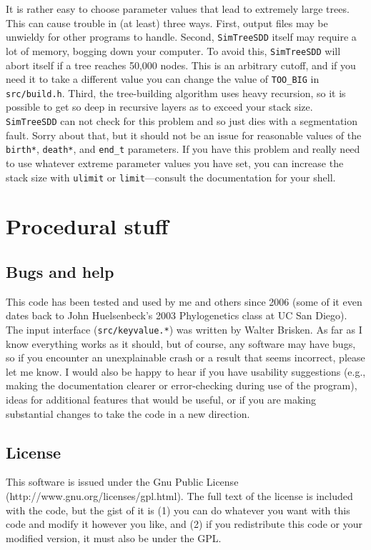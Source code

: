 \documentclass[10pt]{article}
\begin{document}
It is rather easy to choose parameter values that lead to extremely large trees.
This can cause trouble in (at least) three ways.
First, output files may be unwieldy for other programs to handle.
Second, \texttt{SimTreeSDD} itself may require a lot of memory, bogging down your computer.
To avoid this, \texttt{SimTreeSDD} will abort itself if a tree reaches 50,000 nodes.
This is an arbitrary cutoff, and if you need it to take a different value you can change the value of \texttt{TOO\_BIG} in \texttt{src/build.h}.
Third, the tree-building algorithm uses heavy recursion, so it is possible to get so deep in recursive layers as to exceed your stack size.
\texttt{SimTreeSDD} can not check for this problem and so just dies with a segmentation fault.  Sorry about that, but it should not be an issue for reasonable values of the \texttt{birth*}, \texttt{death*}, and \texttt{end\_t} parameters.
If you have this problem and really need to use whatever extreme parameter values you have set, you can increase the stack size with \texttt{ulimit} or \texttt{limit}---consult the documentation for your shell.


\section*{Procedural stuff}

\subsection*{Bugs and help}
This code has been tested and used by me and others since 2006 (some of it even dates back to John Huelsenbeck's 2003 Phylogenetics class at UC San Diego).
The input interface (\texttt{src/keyvalue.*}) was written by Walter Brisken.
As far as I know everything works as it should, but of course, any software may have bugs, so if you encounter an unexplainable crash or a result that seems incorrect, please let me know.
I would also be happy to hear if you have usability suggestions (e.g., making the documentation clearer or error-checking during use of the program), ideas for additional features that would be useful, or if you are making substantial changes to take the code in a new direction.

\subsection*{License}
This software is issued under the Gnu Public License (http://www.gnu.org/licenses/gpl.html).  
The full text of the license is included with the code, but the gist of it is (1) you can do whatever you want with this code and modify it however you like, and (2) if you redistribute this code or your modified version, it must also be under the GPL.
\end{document}
